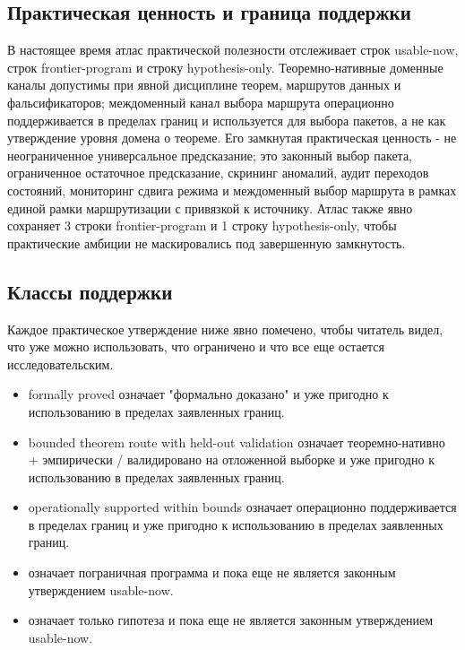 \subsection{Практическая ценность и граница поддержки}
В настоящее время атлас практической полезности отслеживает  строк usable-now,  строк frontier-program и  строку hypothesis-only.
Теоремно-нативные доменные каналы допустимы при явной дисциплине теорем, маршрутов данных и фальсификаторов; междоменный канал выбора маршрута операционно поддерживается в пределах границ и используется для выбора пакетов, а не как утверждение уровня домена о теореме.
Его замкнутая практическая ценность - не неограниченное универсальное предсказание; это законный выбор пакета, ограниченное остаточное предсказание, скрининг аномалий, аудит переходов состояний, мониторинг сдвига режима и междоменный выбор маршрута в рамках единой рамки маршрутизации с привязкой к источнику.
Атлас также явно сохраняет 3 строки frontier-program и 1 строку hypothesis-only, чтобы практические амбиции не маскировались под завершенную замкнутость.

\subsection{Классы поддержки}
Каждое практическое утверждение ниже явно помечено, чтобы читатель видел, что уже можно использовать, что ограничено и что все еще остается исследовательским.
\begin{itemize}[leftmargin=1.6em,nosep]
\item formally proved означает "формально доказано" и уже пригодно к использованию в пределах заявленных границ.
\item bounded theorem route with held-out validation означает теоремно-нативно + эмпирически / валидировано на отложенной выборке и уже пригодно к использованию в пределах заявленных границ.
\item operationally supported within bounds означает операционно поддерживается в пределах границ и уже пригодно к использованию в пределах заявленных границ.
\item {} означает пограничная программа и пока еще не является законным утверждением usable-now.
\item {} означает только гипотеза и пока еще не является законным утверждением usable-now.
\end{itemize}

